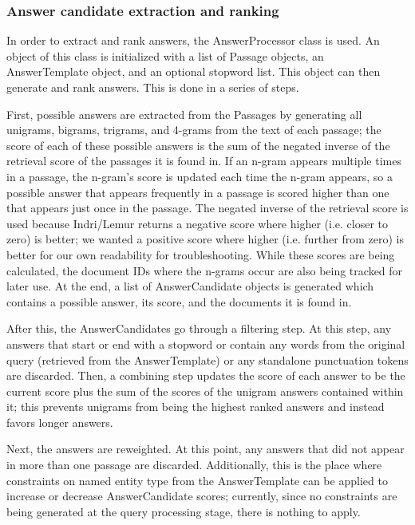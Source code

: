 \documentclass[11pt]{article}
\begin{document}
\subsubsection{Answer candidate extraction and ranking}

In order to extract and rank answers, the AnswerProcessor class is used.  An object of this class is initialized with a list of Passage objects, an AnswerTemplate object, and an optional stopword list.  This object can then generate and rank answers.  This is done in a series of steps.

First, possible answers are extracted from the Passages by generating all unigrams, bigrams, trigrams, and 4-grams from the text of each passage; the score of each of these possible answers is the sum of the negated inverse of the retrieval score of the passages it is found in.  If an n-gram appears multiple times in a passage, the n-gram's score is updated each time the n-gram appears, so a possible answer that appears frequently in a passage is scored higher than one that appears just once in the passage.  The negated inverse of the retrieval score is used because Indri/Lemur returns a negative score where higher (i.e. closer to zero) is better; we wanted a positive score where higher (i.e. further from zero) is better for our own readability for troubleshooting.  While these scores are being calculated, the document IDs where the n-grams occur are also being tracked for later use.  At the end, a list of AnswerCandidate objects is generated which contains a possible answer, its score, and the documents it is found in.

After this, the AnswerCandidates go through a filtering step.  At this step, any answers that start or end with a stopword or contain any words from the original query (retrieved from the AnswerTemplate) or any standalone punctuation tokens are discarded.  Then, a combining step updates the score of each answer to be the current score plus the sum of the scores of the unigram answers contained within it; this prevents unigrams from being the highest ranked answers and instead favors longer answers.

Next, the answers are reweighted.  At this point, any answers that did not appear in more than one passage are discarded.  Additionally, this is the place where constraints on named entity type from the AnswerTemplate can be applied to increase or decrease AnswerCandidate scores; currently, since no constraints are being generated at the query processing stage, there is nothing to apply.
\end{document}
